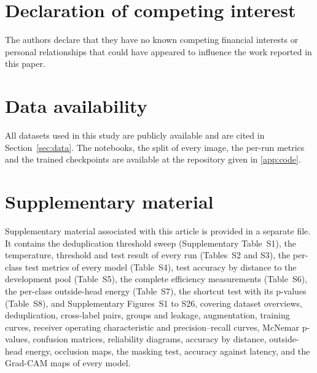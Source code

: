 \documentclass[final,3p,times,number]{elsarticle}
\begin{document}
\section*{Declaration of competing interest}

The authors declare that they have no known competing financial interests or personal relationships that could have appeared to influence the work reported in this paper.

\section*{Data availability}

All datasets used in this study are publicly available and are cited in Section~\ref{sec:data}. The notebooks, the split of every image, the per-run metrics and the trained checkpoints are available at the repository given in \ref{app:code}.

\section*{Supplementary material}

Supplementary material associated with this article is provided in a separate file. It contains the deduplication threshold sweep (Supplementary Table~S1), the temperature, threshold and test result of every run (Tables~S2 and S3), the per-class test metrics of every model (Table~S4), test accuracy by distance to the development pool (Table~S5), the complete efficiency measurements (Table~S6), the per-class outside-head energy (Table~S7), the shortcut test with its p-values (Table~S8), and Supplementary Figures~S1 to S26, covering dataset overviews, deduplication, cross-label pairs, groups and leakage, augmentation, training curves, receiver operating characteristic and precision--recall curves, McNemar p-values, confusion matrices, reliability diagrams, accuracy by distance, outside-head energy, occlusion maps, the masking test, accuracy against latency, and the Grad-CAM maps of every model.
\end{document}
